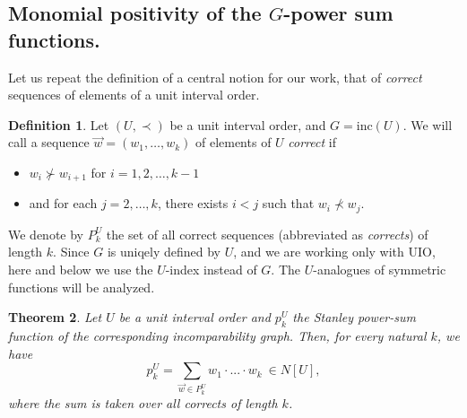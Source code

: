 \documentclass{article}
\theoremstyle{plain}
\newtheorem{thm}{Theorem}[section]
\theoremstyle{definition}
\newtheorem{defn}[thm]{Definition}
\begin{document}
\subsection{Monomial positivity of the $G$-power sum  functions.}


Let us repeat the definition of a central notion for our work, that of
{\em correct} sequences of elements of a unit interval order.
\begin{defn}
 Let $(U,\prec)$ be a unit interval order, and $G=\text{inc}(U)$. We will call a sequence $\vec{w} = (w_1,\dots, w_k)$ of elements of $U$ {\em
   correct} if
 \begin{itemize}
 \item 
$w_i\not\succ w_{i+1}$ for $i=1,2,\dots,k-1$ 
\item and for
 each $j=2,\dots,k$, there exists $i<j$ such that $w_i\not\prec w_j$.
 \end{itemize}
\end{defn}
 
We denote by $P^U_k$ the set of all correct sequences (abbreviated as  {\em
   corrects}) of length $k$. Since $G$ is uniqely defined by $U$, and we are working only with UIO, here and below we use the $U$-index instead of $G$. The $U$-analogues of symmetric functions will be analyzed.

\begin{thm}\label{Ppos}
Let $U$ be a unit interval order and $p_k^U$ the Stanley power-sum function of the corresponding incomparability graph.
Then, for
every natural $k$, we have $$p_k^U=\sum\limits_{\vec{w}\in P^U_k} w_1\cdot...\cdot w_k\ \in N[U],$$ where the sum is taken over all corrects of length $k$.
\end{thm}
\end{document}
